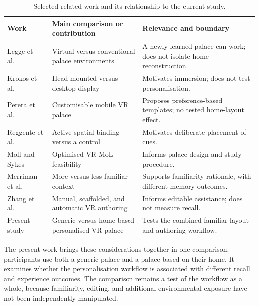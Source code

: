 \begin{table}[htbp]
\centering
\small
\caption{Selected related work and its relationship to the current study.}
\label{tab:literature}
\begin{tabularx}{\textwidth}{@{}p{2.7cm}XX@{}}
\toprule
Work & Main comparison or contribution & Relevance and boundary \\
\midrule
Legge et al.~\cite{legge2012} & Virtual versus conventional palace environments & A newly learned palace can work; does not isolate home reconstruction. \\
Krokos et al.~\cite{krokos2019} & Head-mounted versus desktop display & Motivates immersion; does not test personalisation. \\
Perera et al.~\cite{perera2019} & Customisable mobile VR palace & Proposes preference-based templates; no tested home-layout effect. \\
Reggente et al.~\cite{reggente2020} & Active spatial binding versus a control & Motivates deliberate placement of cues. \\
Moll and Sykes~\cite{moll2023} & Optimised VR MoL feasibility & Informs palace design and study procedure. \\
Merriman et al.~\cite{merriman2016} & More versus less familiar context & Supports familiarity rationale, with different memory outcomes. \\
Zhang et al.~\cite{zhang2024} & Manual, scaffolded, and automatic VR authoring & Informs editable assistance; does not measure recall. \\
Present study & Generic versus home-based personalised VR palace & Tests the combined familiar-layout and authoring workflow. \\
\bottomrule
\end{tabularx}
\end{table}

The present work brings these considerations together in one comparison: participants use both a generic palace and a palace based on their home. It examines whether the personalisation workflow is associated with different recall and experience outcomes. The comparison remains a test of the workflow as a whole, because familiarity, editing, and additional environmental exposure have not been independently manipulated.

